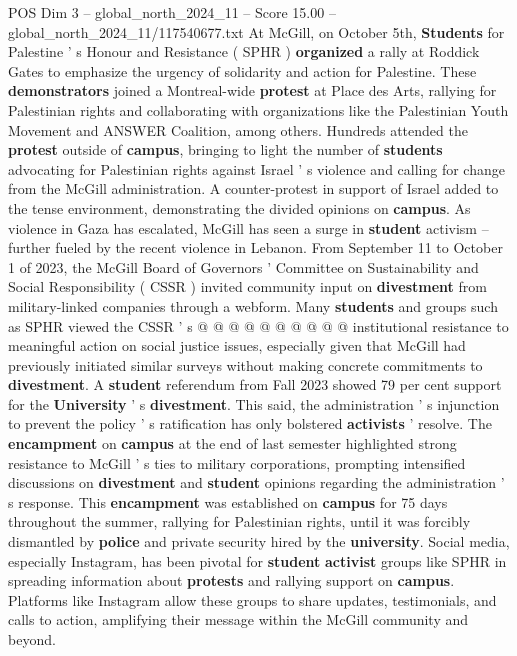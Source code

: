 \begin{textsample}{POS Dim 3 – global\_north\_2024\_11 – Score 15.00 – global\_north\_2024\_11/117540677.txt}  \label{ex:f3_pos_174}
At McGill, on October 5th, \textbf{Students} for Palestine ' s Honour and Resistance ( SPHR ) \textbf{organized} a rally at Roddick Gates to emphasize the urgency of solidarity and action for Palestine.
These \textbf{demonstrators} joined a Montreal-wide \textbf{protest} at Place des Arts, rallying for Palestinian rights and collaborating with organizations like the Palestinian Youth Movement and ANSWER Coalition, among others.
Hundreds attended the \textbf{protest} outside of \textbf{campus}, bringing to light the number of \textbf{students} advocating for Palestinian rights against Israel ' s violence and calling for change from the McGill administration.
A counter-protest in support of Israel added to the tense environment, demonstrating the divided opinions on \textbf{campus}.
As violence in Gaza has escalated, McGill has seen a surge in \textbf{student} activism -- further fueled by the recent violence in Lebanon.
From September 11 to October 1 of 2023, the McGill Board of Governors ' Committee on Sustainability and Social Responsibility ( CSSR ) invited community input on \textbf{divestment} from military-linked companies through a webform.
Many \textbf{students} and groups such as SPHR viewed the CSSR ' s @ @ @ @ @ @ @ @ @ @ institutional resistance to meaningful action on social justice issues, especially given that McGill had previously initiated similar surveys without making concrete commitments to \textbf{divestment}.
A \textbf{student} referendum from Fall 2023 showed 79 per cent support for the \textbf{University} ' s \textbf{divestment}.
This said, the administration ' s injunction to prevent the policy ' s ratification has only bolstered \textbf{activists} ' resolve.
The \textbf{encampment} on \textbf{campus} at the end of last semester highlighted strong resistance to McGill ' s ties to military corporations, prompting intensified discussions on \textbf{divestment} and \textbf{student} opinions regarding the administration ' s response.
This \textbf{encampment} was established on \textbf{campus} for 75 days throughout the summer, rallying for Palestinian rights, until it was forcibly dismantled by \textbf{police} and private security hired by the \textbf{university}.
Social media, especially Instagram, has been pivotal for \textbf{student} \textbf{activist} groups like SPHR in spreading information about \textbf{protests} and rallying support on \textbf{campus}.
Platforms like Instagram allow these groups to share updates, testimonials, and calls to action, amplifying their message within the McGill community and beyond.

\end{textsample}
